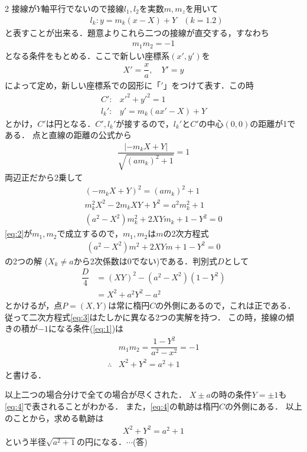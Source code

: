 \documentclass[../../main.tex]{subfiles}
\begin{document}
\begin{multicols}{2}
  接線が$Y$軸平行でないので接線$l_1, l_2$を実数$m, m_z$を用いて
  \begin{align}
    & l_k: y = m_k(x-X)+Y & (k=1.2)
  \end{align}
  と表すことが出来る．題意よりこれら二つの接線が直交する，すなわち
  \begin{align}
    m_1m_2=-1 \label{eq:1}
  \end{align}
  となる条件をもとめる．ここで新しい座標系$(x', y')$を
  \begin{align}
    X'=\dfrac{x}{a}, \quad Y'=y
  \end{align}
  によって定め，新しい座標系での図形に「$'$」をつけて表す．この時
  \begin{align}
    C':   & x'^2+y'^2=1     \\
    l_k': & y'=m_k(ax'-X)+Y
  \end{align}
  とかけ，$C'$は円となる．$C', l_k'$が接するので，$l_k'$と$C'$の中心$(0,0)$の距離が1である．
  点と直線の距離の公式から
  \begin{align}
    \dfrac{|-m_k X+Y|}{\sqrt{(am_k)^2+1}}=1
  \end{align}
  両辺正だから2乗して
  \begin{align}
    (-m_k X+Y)^2 = (am_k)^2+1 \nonumber                 \\
    m_k^2 X^2 - 2m_k XY + Y^2 = a^2 m_k^2 + 1 \nonumber \\
    (a^2-X^2)m_k^2 + 2XY m_k + 1- Y^2 = 0 \label{eq:2}
  \end{align}
  \cref{eq:2}が$m_1, m_2$で成立するので，$m_1, m_2$は$m$の2次方程式
  \begin{align}
    (a^2-X^2)m^2+2XY m + 1-Y^2 = 0   \label{eq:3}
  \end{align}
  の2つの解 ($X_k \neq a$から2次係数は$0$でない)である．判別式$D$として
  \begin{align}
    \dfrac{D}{4}
    & =(XY)^2-(a^2-X^2)(1-Y^2) \\
    & =X^2 + a^2Y^2-a^2
  \end{align}
  とかけるが，点$P=(X,Y)$は常に楕円$C$の外側にあるので，これは正である．
  従って二次方程式\cref{eq:3}はたしかに異なる2つの実解を持つ．
  この時，接線の傾きの積が$-1$になる条件(\cref{eq:1})は
  \begin{align}
    & m_1m_2 = \dfrac{1-Y^2}{a^2-x^2}=-1 \nonumber \\
    \therefore
    & X^2+Y^2=a^2+1  \label{eq:4}
  \end{align}
  と書ける．

  以上二つの場合分けで全ての場合が尽くされた．
  $X\pm a$の時の条件$Y=\pm 1$も\cref{eq:4}で表されることがわかる．
  また，\cref{eq:4}の軌跡は楕円$C$の外側にある．
  以上のことから，求める軌跡は
  \begin{align}
    X^2+Y^2=a^2+1
  \end{align}
  という半径$\sqrt{a^2+1}$の円になる．$\cdots$(答)


\end{multicols}
\end{document}
